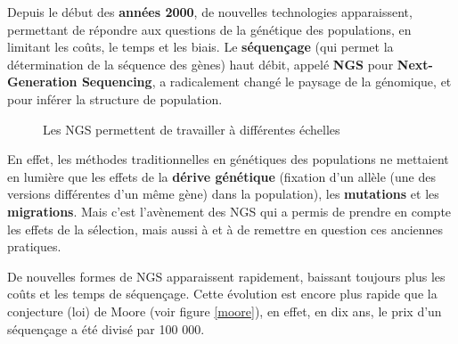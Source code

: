 \documentclass[a4paper,11pt,twoside]{report}
\begin{document}
Depuis le début des \textbf{années 2000}, de nouvelles technologies apparaissent, permettant de répondre aux questions de la génétique des populations, en limitant les coûts, le temps et les biais. Le \textbf{séquençage} (qui permet la détermination de la séquence des gènes) haut débit, appelé \textbf{NGS} pour \textbf{Next-Generation Sequencing}, a radicalement changé le paysage de la génomique, et pour inférer la structure de population.

\begin{figure}[!ht]
\caption{Les NGS permettent de travailler à différentes échelles\citep{shendure2012expanding}}
\end{figure}

En effet, les méthodes traditionnelles en génétiques des populations ne mettaient en lumière que les effets de la \textbf{dérive génétique} (fixation d'un allèle (une des versions différentes d'un même gène) dans la population), les \textbf{mutations} et les \textbf{migrations}. Mais c'est l'avènement des NGS qui a permis de prendre en compte les effets de la sélection, mais aussi à \citep{bazin2006population} et à \citep{kashi2006simple} de remettre en question ces anciennes pratiques. 

De nouvelles formes de NGS apparaissent rapidement, baissant toujours plus les coûts et les temps de séquençage. Cette évolution est encore plus rapide que la conjecture (loi) de Moore (voir figure \ref{moore}), en effet, en dix ans, le prix d'un séquençage a été divisé par 100 000.
\end{document}
